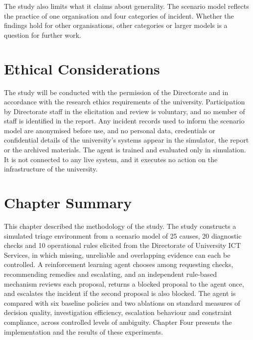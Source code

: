 \documentclass[12pt,a4paper]{article}
\begin{document}
The study also limits what it claims about generality. The scenario model reflects the practice of one organisation and four categories of incident. Whether the findings hold for other organisations, other categories or larger models is a question for further work.

\section{Ethical Considerations}

The study will be conducted with the permission of the Directorate and in accordance with the research ethics requirements of the university. Participation by Directorate staff in the elicitation and review is voluntary, and no member of staff is identified in the report. Any incident records used to inform the scenario model are anonymised before use, and no personal data, credentials or confidential details of the university's systems appear in the simulator, the report or the archived materials. The agent is trained and evaluated only in simulation. It is not connected to any live system, and it executes no action on the infrastructure of the university.

\section{Chapter Summary}

This chapter described the methodology of the study. The study constructs a simulated triage environment from a scenario model of 25 causes, 20 diagnostic checks and 10 operational rules elicited from the Directorate of University ICT Services, in which missing, unreliable and overlapping evidence can each be controlled. A reinforcement learning agent chooses among requesting checks, recommending remedies and escalating, and an independent rule-based mechanism reviews each proposal, returns a blocked proposal to the agent once, and escalates the incident if the second proposal is also blocked. The agent is compared with six baseline policies and two ablations on standard measures of decision quality, investigation efficiency, escalation behaviour and constraint compliance, across controlled levels of ambiguity. Chapter Four presents the implementation and the results of these experiments.
\end{document}
